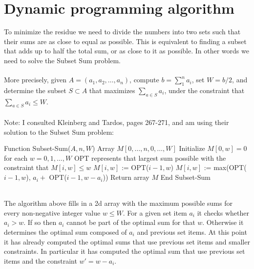 \documentclass[11pt]{article}
\title{}
\author{}
\date{}                                           %
\begin{document}
\maketitle

\section{Dynamic programming algorithm}
To minimize the residue we need to divide the numbers into two sets such that their sums are as close to equal as possible. This is equivalent to finding a subset that adds up to half the total sum, or as close to it as possible. In other words we need to solve the Subset Sum problem. \\
\\
More precisely, given $A = (a_1,a_2,\dots,a_n)$, compute $b = \sum_1^n a_i$, set $W = b/2$, and determine the subset $S \subset A$ that maximizes $\sum_{a \in S} a_i$, under the constraint that $\sum_{a \in S} a_i \le W$.\\
\\
Note: I consulted Kleinberg and Tardos, pages 267-271, and am using their solution to the Subset Sum problem: \\
\begin{algorithmic}
\STATE Function Subset-Sum($A, n, W$)
\STATE Array $M[0, \dots, n, 0, \dots, W]$
\STATE Initialize $M[0, w] = 0$ for each $w = 0, 1, \dots, W$
\STATE OPT represents that largest sum possible with the constraint that $M[i, w] \le w$
\STATE $M[i, w]$ := OPT($i-1,w$)
\ELSE
\STATE $M[i, w]$ := max(OPT($i-1,w$), $a_i + $ OPT($i-1,w-a_i$))
\ENDIF
\ENDFOR
\ENDFOR
\STATE Return array $M$
\STATE End Subset-Sum \\
\end{algorithmic}
\leavevmode
\\
The algorithm above fills in a 2d array with the maximum possible sums for every non-negative integer value $w \le W$. For a given set item $a_i$ it checks whether $a_i > w$. If so then $a_i$ cannot be part of the optimal sum for that $w$. Otherwise it determines the optimal sum composed of $a_i$ and previous set items. At this point it has already computed the optimal sums that use previous set items and smaller constraints. In particular it has computed the optimal sum that use previous set items and the constraint $w' = w - a_i$.\\
\end{document}

